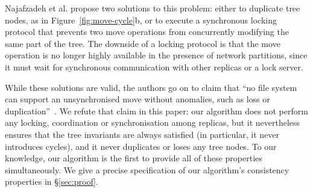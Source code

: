\documentclass[sigplan,anonymous]{acmart}
\begin{document}
Najafzadeh et al. propose two solutions to this problem: either to duplicate tree nodes, as in Figure~\ref{fig:move-cycle}b, or to execute a synchronous locking protocol that prevents two move operations from concurrently modifying the same part of the tree.
The downside of a locking protocol is that the move operation is no longer highly available in the presence of network partitions, since it must wait for synchronous communication with other replicas or a lock server.

While these solutions are valid, the authors go on to claim that ``no file system can support an unsynchronised move without anomalies, such as loss or duplication''~\cite{Najafzadeh:2018bw}.
We refute that claim in this paper: our algorithm does not perform any locking, coordination or synchronisation among replicas, but it nevertheless ensures that the tree invariants are always satisfied (in particular, it never introduces cycles), and it never duplicates or loses any tree nodes.
To our knowledge, our algorithm is the first to provide all of these properties simultaneously.
We give a precise specification of our algorithm's consistency properties in \S\ref{sec:proof}.
\end{document}
